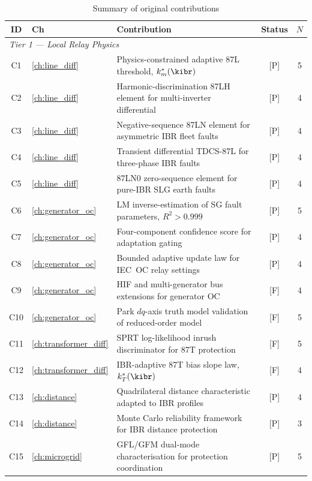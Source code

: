 \begin{table}[htbp]
\caption{Summary of original contributions}
\label{tab:ch1_contributions}
\small
\begin{tabularx}{\textwidth}{@{}clp{8cm}cc@{}}
\toprule
ID & Ch & Contribution & Status & $N$ \\
\midrule
\multicolumn{5}{l}{\textit{Tier 1 --- Local Relay Physics}} \\
C1  & \ref{ch:line_diff}
  & Physics-constrained adaptive 87L threshold, $k_m^*(\kibr)$
  & [P] & 5 \\
C2  & \ref{ch:line_diff}
  & Harmonic-discrimination 87LH element for multi-inverter differential
  & [P] & 4 \\
C3  & \ref{ch:line_diff}
  & Negative-sequence 87LN element for asymmetric IBR fleet faults
  & [P] & 4 \\
C4  & \ref{ch:line_diff}
  & Transient differential TDCS-87L for three-phase IBR faults
  & [P] & 4 \\
C5  & \ref{ch:line_diff}
  & 87LN0 zero-sequence element for pure-IBR SLG earth faults
  & [P] & 4 \\
C6  & \ref{ch:generator_oc}
  & LM inverse-estimation of SG fault parameters, $R^2>0.999$
  & [P] & 5 \\
C7  & \ref{ch:generator_oc}
  & Four-component confidence score for adaptation gating
  & [P] & 4 \\
C8  & \ref{ch:generator_oc}
  & Bounded adaptive update law for IEC~OC relay settings
  & [P] & 4 \\
C9  & \ref{ch:generator_oc}
  & HIF and multi-generator bus extensions for generator OC
  & [F] & 4 \\
C10 & \ref{ch:generator_oc}
  & Park $dq$-axis truth model validation of reduced-order model
  & [F] & 5 \\
C11 & \ref{ch:transformer_diff}
  & SPRT log-likelihood inrush discriminator for 87T protection
  & [F] & 5 \\
C12 & \ref{ch:transformer_diff}
  & IBR-adaptive 87T bias slope law, $k_T^*(\kibr)$
  & [F] & 4 \\
C13 & \ref{ch:distance}
  & Quadrilateral distance characteristic adapted to IBR profiles
  & [P] & 4 \\
C14 & \ref{ch:distance}
  & Monte Carlo reliability framework for IBR distance protection
  & [P] & 3 \\
C15 & \ref{ch:microgrid}
  & GFL/GFM dual-mode characterisation for protection coordination
  & [P] & 5 \\

\end{tabularx}
\end{table}
